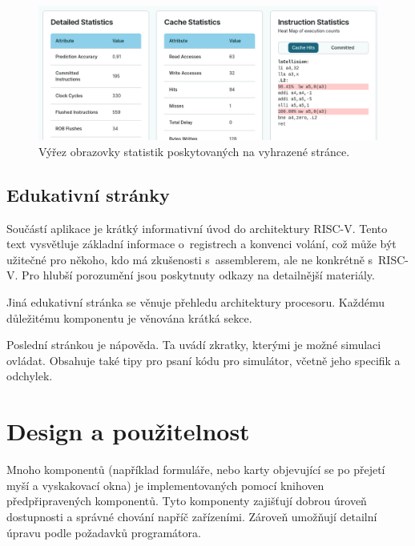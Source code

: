 \begin{figure}[hbtp]
    \begin{center}
        \includegraphics[width=15cm]{obrazky-figures/impl/stats.png}
    \end{center}
    \caption{Výřez obrazovky statistik poskytovaných na vyhrazené stránce.}
    \label{stats_screenshot}
\end{figure}

\subsection{Edukativní stránky}

Součástí aplikace je krátký informativní úvod do architektury RISC-V.
Tento text vysvětluje základní informace o~registrech a konvenci volání, což může být užitečné pro někoho, kdo má zkušenosti s~assemblerem, ale ne konkrétně s~RISC-V.
Pro hlubší porozumění jsou poskytnuty odkazy na detailnější materiály.

Jiná edukativní stránka se věnuje přehledu architektury procesoru.
Každému důležitému komponentu je věnována krátká sekce.

Poslední stránkou je nápověda.
Ta uvádí zkratky, kterými je možné simulaci ovládat.
Obsahuje také tipy pro psaní kódu pro simulátor, včetně jeho specifik a odchylek.

\section{Design a použitelnost}

Mnoho komponentů (například formuláře, nebo karty objevující se po přejetí myší a vyskakovací okna) je implementovaných pomocí knihoven předpřipravených komponentů.
Tyto komponenty zajišťují dobrou úroveň dostupnosti a správné chování napříč zařízeními.
Zároveň umožňují detailní úpravu podle požadavků programátora.

